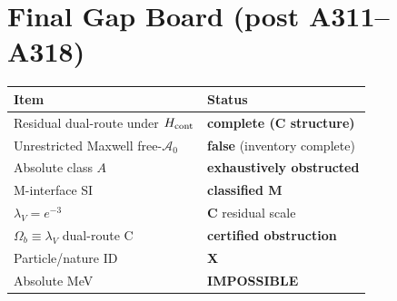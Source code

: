 \section*{Final Gap Board (post A311--A318)}
\begin{center}
\begin{tabular}{@{}p{4.2cm}p{7.8cm}@{}}
\toprule
Item & Status \\
\midrule
Residual dual-route under $H_{\rm cont}$ & \textbf{complete (C structure)} \\
Unrestricted Maxwell free-$\mathcal{A}_0$ & \textbf{false} (inventory complete) \\
Absolute class $A$ & \textbf{exhaustively obstructed} \\
M-interface SI & \textbf{classified M} \\
$\lambda_V=e^{-3}$ & \textbf{C} residual scale \\
$\Omega_b\equiv\lambda_V$ dual-route C & \textbf{certified obstruction} \\
Particle/nature ID & \textbf{X} \\
Absolute MeV & \textbf{IMPOSSIBLE} \\
\bottomrule
\end{tabular}
\end{center}
